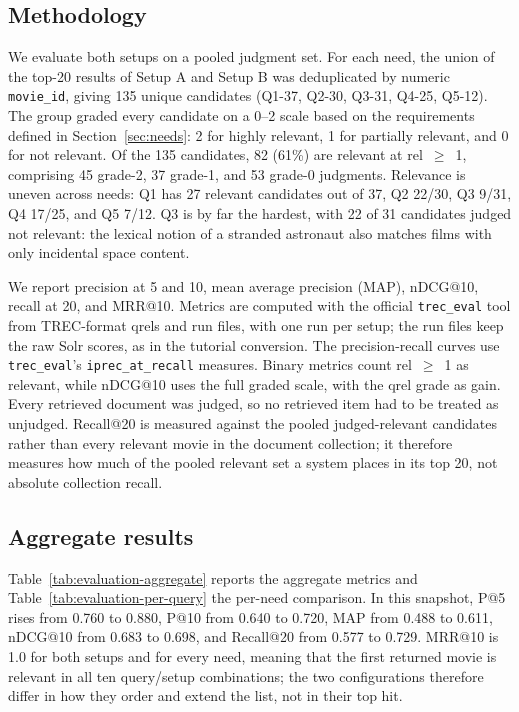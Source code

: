 \documentclass[sigconf]{acmart}
\begin{document}
\subsection{Methodology}
We evaluate both setups on a pooled judgment set. For each need, the union of the
top-20 results of Setup A and Setup B was deduplicated by numeric
\texttt{movie\_id}, giving 135 unique candidates (Q1-37, Q2-30, Q3-31, Q4-25,
Q5-12). The group graded every candidate on a 0--2 scale based on the requirements defined in
Section~\ref{sec:needs}: 2 for highly relevant, 1 for partially relevant, and 0 for
not relevant. Of the 135 candidates, 82 (61\%) are relevant at rel~$\geq$~1,
comprising 45 grade-2, 37 grade-1, and 53 grade-0 judgments. Relevance is uneven
across needs: Q1 has 27 relevant candidates out of 37, Q2 22/30, Q3 9/31, Q4 17/25,
and Q5 7/12. Q3 is by far the hardest, with 22 of 31 candidates judged not relevant:
the lexical notion of a stranded astronaut also matches films with only incidental
space content.

We report precision at 5 and 10, mean average precision (MAP), nDCG@10, recall at
20, and MRR@10. Metrics are computed with the official \texttt{trec\_eval} tool
from TREC-format qrels and run files, with one run per setup; the run files keep
the raw Solr scores, as in the tutorial conversion. The precision-recall curves
use \texttt{trec\_eval}'s \texttt{iprec\_at\_recall} measures. Binary metrics count
rel~$\geq$~1 as relevant, while nDCG@10 uses the full graded scale, with the qrel
grade as gain. Every retrieved document was judged, so no retrieved item had to
be treated as unjudged. Recall@20 is measured against the pooled judged-relevant
candidates rather than every relevant movie in the document collection; it
therefore measures how much of the pooled relevant set a system places in its top
20, not absolute collection recall. 

\subsection{Aggregate results}
Table~\ref{tab:evaluation-aggregate} reports the aggregate metrics and
Table~\ref{tab:evaluation-per-query} the per-need comparison. In this snapshot,
P@5 rises from 0.760 to 0.880, P@10 from
0.640 to 0.720, MAP from 0.488 to 0.611, nDCG@10 from 0.683 to 0.698, and Recall@20
from 0.577 to 0.729. MRR@10 is 1.0 for both setups and for every need, meaning that
the first returned movie is relevant in all ten query/setup combinations; the two
configurations therefore differ in how they order and extend the list, not in their
top hit.
\end{document}
